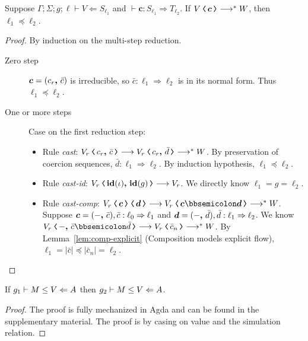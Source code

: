 \begin{lemma}
\label{lem:cast-leq}
Suppose $\Gamma ; \Sigma ; g ; \ell \vdash V \Leftarrow S_{\ell_1}$ and
$\vdash \bm{c} : S_{\ell_1} \Rightarrow T_{\ell_2}$. If $\cccast{V}{\bm{c}} \longrightarrow^{*} W$,
then $\ell_1 \preccurlyeq \ell_2$.
\end{lemma}
\begin{proof}
By induction on the multi-step reduction.
\begin{description}
\item[Zero step] $\bm{c} = ({c_r}\boldsymbol{,}\,{\bar{c}})$ is irreducible, so
$\bar{c} : \ell_1 \Rightarrow \ell_2$ is in its normal form. Thus $\ell_1 \preccurlyeq \ell_2$.
\item[One or more steps] Case on the first reduction step:
\begin{itemize}
\item Rule \textit{cast}: $\cccast{V_r}{\coerc{c_r}{\bar{c}}} \longrightarrow \cccast{V_r}{\coerc{c_r}{\bar{d}}} \longrightarrow^{*} W$.
  By preservation of coercion sequences, $\bar{d} : \ell_1 \Rightarrow \ell_2$. By induction hypothesis, $\ell_1 \preccurlyeq \ell_2$.
\item Rule \textit{cast-id}: $\cccast{V_r}{\coerc{\id{\iota}}{\id{g}}} \longrightarrow V_r$. We directly know $\ell_1 = g = \ell_2$.
\item Rule \textit{cast-comp}: $\cccast{\cccast{V_r}{\bm{c}}}{\bm{d}} \longrightarrow \cccast{V_r}{\bm{c} \mdoubleplus \bm{d}} \longrightarrow^{*} W$.
      Suppose $\bm{c} = ({-}\boldsymbol{,}\,{\bar{c}}), \bar{c} : \ell_0 \Rightarrow \ell_1$ and
      $\bm{d} = ({-}\boldsymbol{,}\,{\bar{d}}), \bar{d} : \ell_1 \Rightarrow \ell_2$.
      We know $\cccast{V_r}{\coerc{-}{\bar{c} \mdoubleplus \bar{d}}} \longrightarrow \cccast{V_r}{\bar{c}_n} \longrightarrow^{*} W$.
      By Lemma~\ref{lem:comp-explicit} (Composition models explicit flow),
      $\ell_1 = |\bar{c}| \preccurlyeq |\bar{c}_n| = \ell_2$.
\end{itemize}
\end{description}
\end{proof}

\begin{lemma}
\label{lem:leq-value-pc}
If ${g_1}\vdash{M}\leq{V}\Leftarrow{A}$ then ${g_2}\vdash{M}\leq{V}\Leftarrow{A}$.
\end{lemma}
\begin{proof}
The proof is fully mechanized in Agda and can be found in the
supplementary material. The proof is by casing on value and the
simulation relation.
\end{proof}


